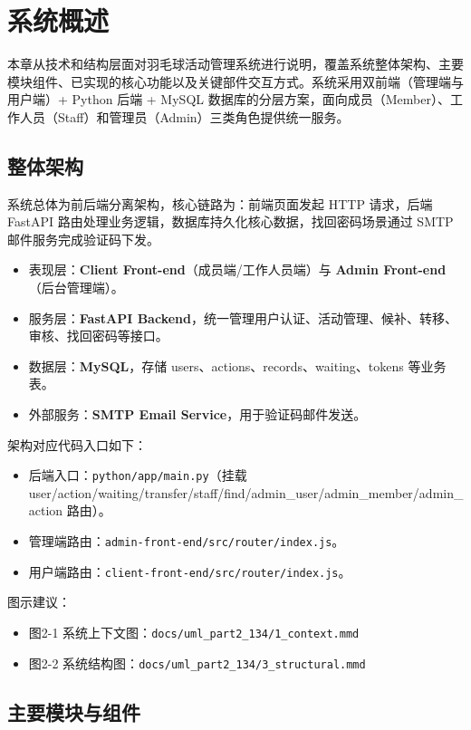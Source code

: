 \section{系统概述}

本章从技术和结构层面对羽毛球活动管理系统进行说明，覆盖系统整体架构、主要模块组件、已实现的核心功能以及关键部件交互方式。系统采用双前端（管理端与用户端）+ Python 后端 + MySQL 数据库的分层方案，面向成员（Member）、工作人员（Staff）和管理员（Admin）三类角色提供统一服务。

\subsection{整体架构}

系统总体为前后端分离架构，核心链路为：前端页面发起 HTTP 请求，后端 FastAPI 路由处理业务逻辑，数据库持久化核心数据，找回密码场景通过 SMTP 邮件服务完成验证码下发。

\begin{itemize}
  \item 表现层：\textbf{Client Front-end}（成员端/工作人员端）与 \textbf{Admin Front-end}（后台管理端）。
  \item 服务层：\textbf{FastAPI Backend}，统一管理用户认证、活动管理、候补、转移、审核、找回密码等接口。
  \item 数据层：\textbf{MySQL}，存储 users、actions、records、waiting、tokens 等业务表。
  \item 外部服务：\textbf{SMTP Email Service}，用于验证码邮件发送。
\end{itemize}

架构对应代码入口如下：
\begin{itemize}
  \item 后端入口：\texttt{python/app/main.py}（挂载 user/action/waiting/transfer/staff/find/admin\_user/admin\_member/admin\_action 路由）。
  \item 管理端路由：\texttt{admin-front-end/src/router/index.js}。
  \item 用户端路由：\texttt{client-front-end/src/router/index.js}。
\end{itemize}

图示建议：
\begin{itemize}
  \item 图2-1 系统上下文图：\texttt{docs/uml\_part2\_134/1\_context.mmd}
  \item 图2-2 系统结构图：\texttt{docs/uml\_part2\_134/3\_structural.mmd}
\end{itemize}

\subsection{主要模块与组件}

